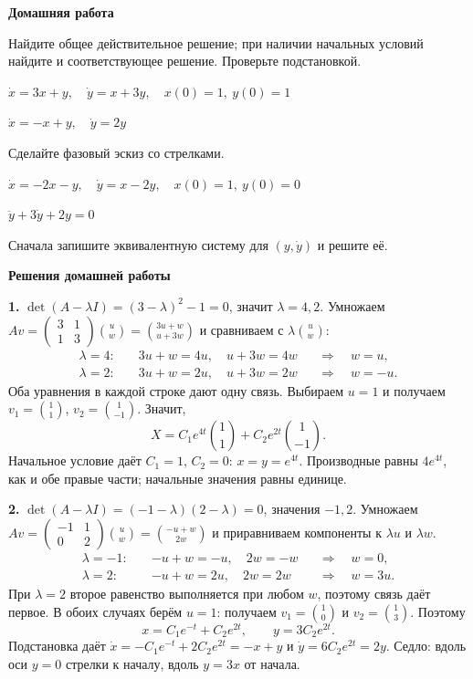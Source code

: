 \documentclass[12pt,a4paper]{article}
\newcommand{\col}[2]{\binom{#1}{#2}}
\newcommand{\mat}[4]{\begin{pmatrix}#1&#2\\#3&#4\end{pmatrix}}
\newcommand{\problem}[2]{\par\medskip\noindent\fbox{\bfseries #1}\quad #2\par}
\newcommand{\st}[1]{\par\medskip\noindent\textbf{#1}\quad}
\begin{document}
\newpage
\begin{center}\bfseries Домашняя работа\end{center}
Найдите общее действительное решение; при наличии начальных условий найдите и соответствующее решение. Проверьте подстановкой.
\problem{1}{$\dot x=3x+y,\quad \dot y=x+3y,\quad x(0)=1,\ y(0)=1$}
\problem{2}{$\dot x=-x+y,\quad \dot y=2y$}
Сделайте фазовый эскиз со стрелками.
\problem{3}{$\dot x=-2x-y,\quad \dot y=x-2y,\quad x(0)=1,\ y(0)=0$}
\problem{4}{$\ddot y+3\dot y+2y=0$}
Сначала запишите эквивалентную систему для $(y,\dot y)$ и решите её.
\bigskip
\begin{center}\bfseries Решения домашней работы\end{center}
\st{1.} $\det(A-\lambda I)=(3-\lambda)^2-1=0$, значит $\lambda=4,2$.
Умножаем $Av=\mat3113\col{u}{w}=\col{3u+w}{u+3w}$ и сравниваем с
$\lambda\col{u}{w}$:
\[
\begin{aligned}
\lambda=4:\quad &3u+w=4u,\quad u+3w=4w &&\Longrightarrow\quad w=u,\\
\lambda=2:\quad &3u+w=2u,\quad u+3w=2w &&\Longrightarrow\quad w=-u .
\end{aligned}
\]
Оба уравнения в каждой строке дают одну связь. Выбираем $u=1$ и получаем
$v_1=\col11$, $v_2=\col1{-1}$. Значит,
\[X=C_1e^{4t}\col11+C_2e^{2t}\col1{-1}.\]
Начальное условие даёт $C_1=1$, $C_2=0$: $x=y=e^{4t}$. Производные равны $4e^{4t}$, как и обе правые части; начальные значения равны единице.
\st{2.} $\det(A-\lambda I)=(-1-\lambda)(2-\lambda)=0$, значения $-1,2$.
Умножаем $Av=\mat{-1}{1}{0}{2}\col{u}{w}=\col{-u+w}{2w}$ и приравниваем
компоненты к $\lambda u$ и $\lambda w$.
\[
\begin{aligned}
\lambda=-1:\quad &-u+w=-u,\quad 2w=-w &&\Longrightarrow\quad w=0,\\
\lambda=2:\quad &-u+w=2u,\quad 2w=2w &&\Longrightarrow\quad w=3u .
\end{aligned}
\]
При $\lambda=2$ второе равенство выполняется при любом $w$, поэтому связь
даёт первое. В обоих случаях берём $u=1$: получаем $v_1=\col10$ и
$v_2=\col13$. Поэтому
\[x=C_1e^{-t}+C_2e^{2t},\qquad y=3C_2e^{2t}.\]
Подстановка даёт $\dot x=-C_1e^{-t}+2C_2e^{2t}=-x+y$ и $\dot y=6C_2e^{2t}=2y$. Седло: вдоль оси $y=0$ стрелки к началу, вдоль $y=3x$ от начала.
\begin{center}\end{center}
\end{document}

